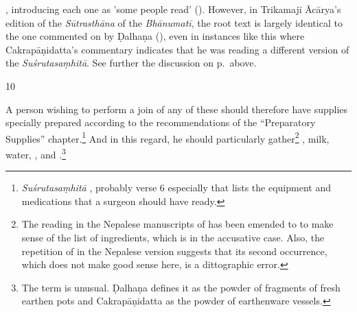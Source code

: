 \begin{translation}
{            \citep[128–129]{acar-1939}, introducing each one as 'some people read' (). However,  in Trikamajī Ācārya's edition of the \emph{Sūtrasthāna}
            of the \emph{Bhānumatī}, the root text is largely identical to the one commented
            on by Ḍalhaṇa (\cite{vulgate}), even in instances like this where Cakrapāṇidatta's
            commentary indicates that he was reading a different version of the
            \emph{Suśrutasaṃhitā}. See further the discussion on p.\,\pageref{skinflap}
            above.} 
            \item[10]
    
A person wishing to perform a join of any of these should therefore have supplies
specially prepared according to the recommendations of the “Preparatory Supplies”
chapter.\footnote{\emph{Suśrutasaṃhitā} , probably verse 6
    especially that lists the equipment and medications that a surgeon should have
    ready.}  And in this regard, he should particularly gather\footnote{The reading in
        the Nepalese manuscripts of  has been emended to
         to make sense of the list of ingredients, which is
        in the accusative case. Also, the repetition of  in the
        Nepalese version suggests that its second occurrence, which does not make good
        sense here, is a dittographic error.} , milk,
        water, , and .\footnote{The term  is unusual. Ḍalhaṇa
            \citep[79]{vulgate} defines it as the powder of fragments of fresh earthen pots
            and Cakrapāṇidatta \citep[129]{acar-1939} as the powder of earthenware vessels.}
    

\end{translation}
